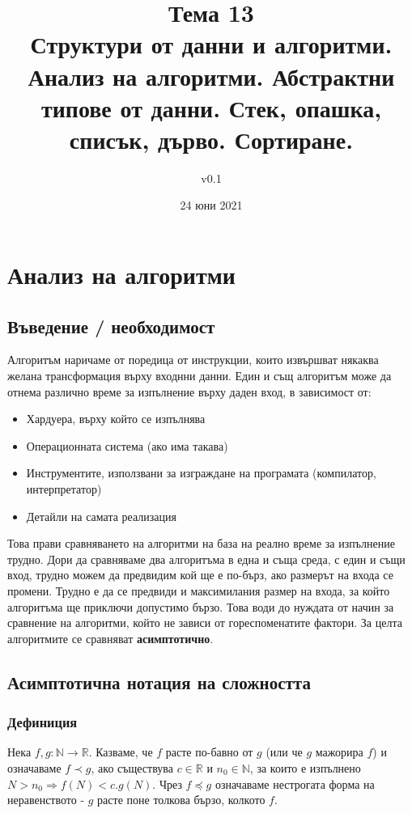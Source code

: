 \documentclass[fleqn,12pt]{article}
\title{Тема 13\\ Структури от данни и алгоритми. Анализ на алгоритми. Абстрактни
типове от данни. Стек, опашка, списък, дърво. Сортиране.}
\author{v0.1}
\date{24 юни 2021}
\begin{document}
\maketitle

\tableofcontents

\section{Анализ на алгоритми}
\subsection{Въведение / необходимост}
Алгоритъм наричаме от поредица от инструкции, които извършват някаква желана трансформация върху входнни данни.
Един и същ алгоритъм може да отнема различно време за изпълнение върху даден вход, в зависимост от:
\begin{itemize}
    \item Хардуера, върху който се изпълнява
    \item Операционната система (ако има такава)
    \item Инструментите, използвани за изграждане на програмата (компилатор, интерпретатор)
    \item Детайли на самата реализация
\end{itemize}

Това прави сравняването на алгоритми на база на реално време за изпълнение трудно. Дори да сравняваме два алгоритъма
в една и съща среда, с един и същи вход, трудно можем да предвидим кой ще е по-бърз, ако размерът на входа се промени.
Трудно е да се предвиди и максимилания размер на входа, за който алгоритъма ще приключи допустимо бързо.
Това води до нуждата от начин за сравнение на алгоритми, който не зависи от гореспоменатите фактори. За целта 
алгоритмите се сравняват \textbf{асимптотично}.

\subsection{Асимптотична нотация на сложността}
\subsubsection{Дефиниция}
Нека $f, g : \mathbb{N} \rightarrow \mathbb{R}$. Казваме, че $f$ расте по-бавно от $g$ (или че $g$ мажорира $f$) и означаваме $f \prec g$, ако 
съществува $c \in \mathbb{R}$ и $n_0 \in \mathbb{N}$, за които е изпълнено $N > n_0 \Rightarrow f(N) < c.g(N)$.
Чрез $f \preceq g$ означаваме нестрогата форма на неравенството - $g$ расте поне толкова бързо, колкото $f$.
\end{document}
